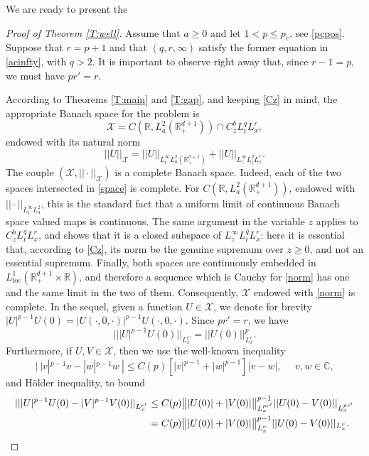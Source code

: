 \documentclass[11pt,letter]{amsart}
\def \RN {\mathbb{R}_+^{d+1}}
\def \R {\mathbb{R}}
\numberwithin{equation}{section}
\newcommand{\Xs}{\mathcal X}
\newcommand{\C}{\mathbb{C}}
\numberwithin{equation}{section}
\begin{document}
We are ready to present the 

\begin{proof}[Proof of Theorem \ref{T:well}]
Assume that $a\ge 0$ and let $1<p\le p_c$, see \eqref{pcpos}. Suppose that $r = p+1$ and that $(q,r,\infty)$ satisfy the former equation in \eqref{acinfty}, with $q>2$. It is important to observe right away that, since $r-1 = p$, we must have $p r' = r$.

According to Theorems \ref{T:main} and \ref{T:gap}, and keeping \eqref{Cz} in mind, the appropriate Banach space for the problem is 
\begin{equation}\label{space}
\mathcal X= C(\R,L^2_a(\RN)) \cap C^{b}_z L^q_t L^r_x ,
\end{equation}
endowed with its natural norm 
\begin{equation}\label{norm}
||U||_{\Xs}= ||U||_{L^\infty_t L^2_a(\RN)} + ||U||_{L^\infty_z L^q_tL^r_x }.
\end{equation}
The couple $(\Xs,||\cdot||_{\Xs})$ is a complete Banach space. Indeed, each of the two spaces intersected in \eqref{space} is complete. For $C(\R,L^2_a(\RN))$, endowed with $||\cdot||_{L^\infty_t L^2_a}$, this is the standard fact that a uniform limit of continuous Banach space valued maps is continuous. The same argument in the variable $z$ applies to $C^b_z L^q_t L^r_x$, and shows that it is a closed subspace of $L^\infty_z L^q_t L^r_x$: here it is essential that, according to \eqref{Cz}, its norm be the genuine supremum over $z\ge 0$, and not an essential supremum. Finally, both spaces are continuously embedded in $L^1_{\operatorname{loc}}(\RN\times \R)$, and therefore a sequence which is Cauchy for \eqref{norm} has one and the same limit in the two of them. Consequently, $\Xs$ endowed with \eqref{norm} is complete.
In the sequel, given a function $U\in \Xs$, we denote for brevity  $|U|^{p-1} U(0) = |U(\cdot,0,\cdot)|^{p-1} U(\cdot,0,\cdot)$. Since $pr' = r$, we have
\begin{equation}\label{UU}
|||U|^{p-1} U(0)||_{L^{r'}_x} = ||U(0)||_{L^r_x}^p.
\end{equation}
Furthermore, if $U, V\in \Xs$, then we use the well-known inequality
\[
|\ |v|^{p-1} v - |w|^{p-1} w\ |\le C(p) \left[|v|^{p-1} + |w|^{p-1}\right] |v - w|,\ \ \ \ \ \ v, w\in \C,
\]
and H\"older inequality, to bound
\begin{align}\label{UUU}
|| |U|^{p-1} U(0) - |V|^{p-1} V(0)||_{L^{r'}_x} & \le C(p) \big\||U(0)| + |V(0)|\big\|^{p-1}_{L^{pr'}_x} ||U(0)-V(0)||_{L^{pr'}_x}
\\
& = C(p) \big\||U(0)| + |V(0)|\big\|^{p-1}_{L^{r}_x}  ||U(0)-V(0)||_{L^{r}_x}.
\notag
\end{align} 
 




\end{proof}
\end{document}
